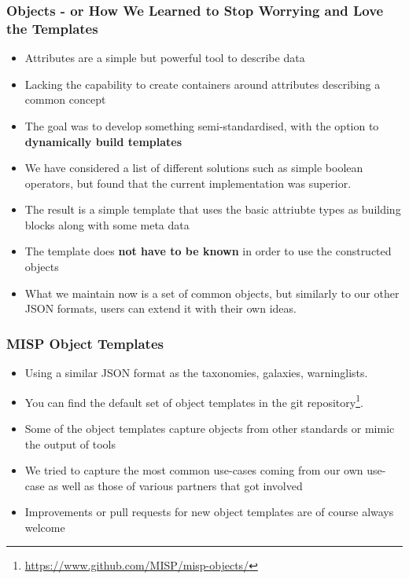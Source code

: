 
\begin{frame}[t,plain]
\titlepage
\end{frame}

\begin{frame}
\frametitle{Objects - or How We Learned to Stop Worrying and Love the Templates}
\begin{itemize}
   \item Attributes are a simple but powerful tool to describe data
   \item Lacking the capability to create containers around attributes describing a common concept
   \item The goal was to develop something semi-standardised, with the option to {\bf dynamically build templates}
   \item We have considered a list of different solutions such as simple boolean operators, but found that the current implementation was superior.
   \item The result is a simple template that uses the basic attriubte types as building blocks along with some meta data
   \item The template does {\bf not have to be known} in order to use the constructed objects
   \item What we maintain now is a set of common objects, but similarly to our other JSON formats, users can extend it with their own ideas.
\end{itemize}
\end{frame}

\begin{frame}
\frametitle{MISP Object Templates}
\begin{itemize}
\item Using a similar JSON format as the taxonomies, galaxies, warninglists.
\item You can find the default set of object templates in the git repository\footnote{\url{https://www.github.com/MISP/misp-objects/}}.
\item Some of the object templates capture objects from other standards or mimic the output of tools
\item We tried to capture the most common use-cases coming from our own use-case as well as those of various partners that got involved
\item Improvements or pull requests for new object templates are of course always welcome
\end{itemize}
\end{frame}

